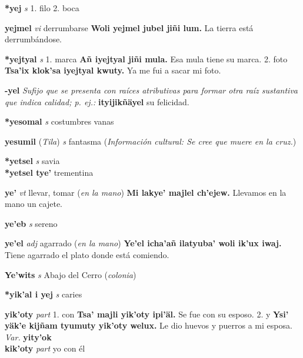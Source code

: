 \documentclass[10pt]{scrbook}
\newcommand{\entry}[1]{\textbf{#1}}
\newcommand{\onedefinition}[1]{#1.}
\newcommand{\nontranslationdef}[1]{\textit{#1}}
\newcommand{\partofspeech}[1]{\textit{#1}}
\newcommand{\spanishtranslation}[1]{#1}
\newcommand{\clarification}[1]{(\textit{#1})}
\newcommand{\cholexample}[1]{\textbf{#1}}
\newcommand{\exampletranslation}[1]{#1}
\newcommand{\relevantdialect}[1]{(\textit{#1})}
\newcommand{\culturalinformation}[1]{(\textit{#1})}
\newcommand{\secondaryentry}[1]{\\\textbf{#1}}
\newcommand{\secondpartofspeech}[1]{\textit{#1}}
\newcommand{\secondtranslation}[1]{#1}
\newcommand{\variation}[1]{\textit{Var.} \textbf{#1}}
\begin{document}
\begin{multicols}{2}
\entry{*yej}
\partofspeech{s}
\onedefinition{1}
\spanishtranslation{filo}
\onedefinition{2}
\spanishtranslation{boca}

\entry{yejmel}
\partofspeech{vi}
\spanishtranslation{derrumbarse}
\cholexample{Woli yejmel jubel jiñi lum.}
\exampletranslation{La tierra está derrumbándose.}

\entry{*yejtyal}
\partofspeech{s}
\onedefinition{1}
\spanishtranslation{marca}
\cholexample{Añ iyejtyal jiñi mula.}
\exampletranslation{Esa mula tiene su marca.}
\onedefinition{2}
\spanishtranslation{foto}
\cholexample{Tsa'ix klok'sa iyejtyal kwuty.}
\exampletranslation{Ya me fui a sacar mi foto.}

\entry{-yel}
\nontranslationdef{Sufijo que se presenta con raíces atributivas para formar otra raíz sustantiva que indica calidad; p. ej.:}
\cholexample{ityijikñäyel}
\exampletranslation{su felicidad.}

\entry{*yesomal}
\partofspeech{s}
\spanishtranslation{costumbres vanas}

\entry{yesumil}
\relevantdialect{Tila}
\partofspeech{s}
\spanishtranslation{fantasma}
\culturalinformation{Información cultural: Se cree que muere en la cruz.}

\entry{*yetsel}
\partofspeech{s}
\spanishtranslation{savia}
\secondaryentry{*yetsel tye'}
\secondtranslation{trementina}

\entry{ye'}
\partofspeech{vt}
\spanishtranslation{llevar, tomar}
\clarification{en la mano}
\cholexample{Mi lakye' majlel ch'ejew.}
\exampletranslation{Llevamos en la mano un cajete.}

\entry{ye'eb}
\partofspeech{s}
\spanishtranslation{sereno}

\entry{ye'el}
\partofspeech{adj}
\spanishtranslation{agarrado}
\clarification{en la mano}
\cholexample{Ye'el icha'añ ilatyuba' woli ik'ux iwaj.}
\exampletranslation{Tiene agarrado el plato donde está comiendo.}

\entry{Ye'wits}
\partofspeech{s}
\spanishtranslation{Abajo del Cerro}
\clarification{colonia}

\entry{*yik'al i yej}
\partofspeech{s}
\spanishtranslation{caries}

\entry{yik'oty}
\partofspeech{part}
\onedefinition{1}
\spanishtranslation{con}
\cholexample{Tsa' majli yik'oty ipi'äl.}
\exampletranslation{Se fue con su esposo.}
\onedefinition{2}
\spanishtranslation{y}
\cholexample{Ysi' yäk'e kijñam tyumuty yik'oty welux.}
\exampletranslation{Le dio huevos y puerros a mi esposa.}
\variation{yity'ok}
\secondaryentry{kik'oty}
\secondpartofspeech{part}
\secondtranslation{yo con él}


\end{multicols}
\end{document}
